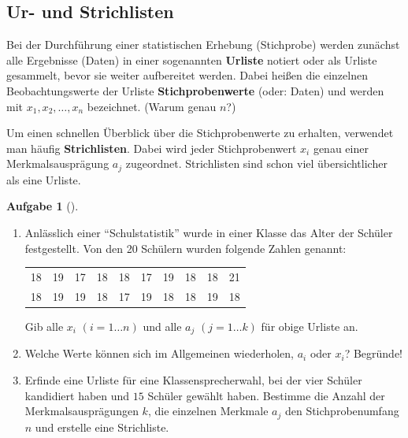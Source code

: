 \documentclass[a4paper, twoside, parskip, 10pt, smallheadings]{scrbook}
\theoremstyle{plain}
\theoremstyle{definition}
\newtheorem{Auf}{Aufgabe}%
\newenvironment{fshaded}{%
\def\FrameCommand{\fcolorbox{framecolor}{shadecolor}}%
\MakeFramed {\FrameRestore}}%
{\endMakeFramed}
\newenvironment{fauf}[1][]{\definecolor{shadecolor}{rgb}{.58,.788,1}%
\definecolor{framecolor}{rgb}{.13,.25,.9}%
\begin{fshaded}\begin{Auf}[#1]}{\end{Auf}\end{fshaded}}
\newcommand{\ba}{\begin{fauf}}
\newcommand{\ea}{\end{fauf}}
\newcommand{\bn}{\begin{enumerate}}
\newcommand{\en}{\end{enumerate}}
\begin{document}
\subsection{Ur- und Strichlisten} 


Bei der Durchf\"{u}hrung einer statistischen Erhebung (Stichprobe) werden zun\"{a}chst alle
Ergebnisse (Daten) in einer sogenannten {\bf Urliste} notiert oder als Urliste gesammelt, bevor sie
weiter aufbereitet werden. Dabei hei{\ss}en die einzelnen Beobachtungswerte der Urliste {\bf
Stichprobenwerte} (oder: Daten) und werden mit $x_1, x_2, \dots, x_n$ bezeichnet. (Warum genau
$n$?)


Um einen schnellen \"{U}berblick \"{u}ber die Stichprobenwerte zu erhalten, verwendet man
h\"{a}ufig {\bf Strichlisten}. Dabei wird jeder Stichprobenwert $x_i$ genau einer
Merkmalsauspr\"{a}gung $a_j$ zugeordnet. Strichlisten sind schon viel \"{u}bersichtlicher als eine Urliste.

\ba \bn \item  \label{bbabc} Anl\"{a}sslich einer "`Schulstatistik"'  wurde in einer Klasse das
Alter der Sch\"{u}ler festgestellt. Von den 20 Sch\"{u}lern wurden folgende Zahlen genannt:
\begin{center}
\begin{tabular}{cccccccccc}
  18 & 19 & 17 & 18 & 18 & 17 & 19 & 18 & 18 & 21 \\
  18 & 19 & 19 & 18 & 17 & 19 & 18 & 18 & 19 & 18 \\
\end{tabular}
\end{center} 

 Gib alle $x_i$ $(i=1\dots n)$ und alle $a_j$ $(j=1\dots k)$ f\"{u}r obige Urliste an.

\item \label{statauf_wieder} \label{a456d} 


  Welche Werte k\"{o}nnen sich im Allgemeinen
wiederholen, $a_i$ oder $x_i$? Begr\"{u}nde!

\item Erfinde eine Urliste f\"{u}r eine Klassensprecherwahl, bei der vier Sch\"{u}ler kandidiert haben und $15$ Sch\"{u}ler gew\"{a}hlt
haben. Bestimme die Anzahl der Merkmalsauspr\"{a}gungen $k$, die einzelnen Merkmale $a_j$  den
Stichprobenumfang $n$ und erstelle eine Strichliste.
\en \ea
\end{document}
